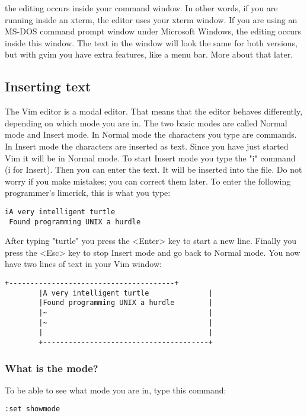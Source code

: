 the editing occurs inside your command window.
In other words, if you are running inside an xterm, the editor uses your xterm window.
If you are using an MS-DOS command prompt window under Microsoft Windows, the editing occurs inside this window.
The text in the window will look the same for both versions, but with gvim you have extra features, like a menu bar.
More about that later.

\subsection{Inserting text}
The Vim editor is a modal editor.
That means that the editor behaves differently, depending on which mode you are in.
The two basic modes are called Normal mode and Insert mode.
In Normal mode the characters you type are commands.
In Insert mode the characters are inserted as text.
Since you have just started Vim it will be in Normal mode.
To start Insert mode you type the "i" command (i for Insert).
Then you can enter the text.
It will be inserted into the file.
Do not worry if you make mistakes; you can correct them later.
To enter the following programmer's limerick, this is what you type:

 \begin{Verbatim}[samepage=true]
 iA very intelligent turtle
 Found programming UNIX a hurdle
 \end{Verbatim}

After typing "turtle" you press the <Enter> key to start a new line.
Finally you press the <Esc> key to stop Insert mode and go back to Normal mode.
You now have two lines of text in your Vim window: 

		\begin{Verbatim}[samepage=true]
		+---------------------------------------+
		|A very intelligent turtle              |
		|Found programming UNIX a hurdle        |
		|~                                      |
		|~                                      |
		|                                       |
		+---------------------------------------+
		\end{Verbatim}

\subsubsection{What is the mode?}

To be able to see what mode you are in, type this command:

 \begin{Verbatim}[samepage=true]
 :set showmode
 \end{Verbatim}

